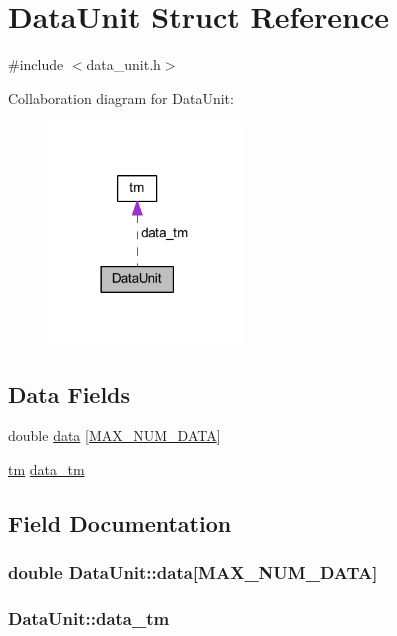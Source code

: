 \hypertarget{struct_data_unit}{\section{Data\-Unit Struct Reference}
\label{struct_data_unit}
}


{\ttfamily \#include $<$data\-\_\-unit.\-h$>$}



Collaboration diagram for Data\-Unit\-:
\nopagebreak
\begin{figure}[H]
\begin{center}
\leavevmode
\includegraphics[width=146pt]{struct_data_unit__coll__graph}
\end{center}
\end{figure}
\subsection*{Data Fields}
\begin{DoxyCompactItemize}
\item 
double \hyperlink{struct_data_unit_a9f22b6f4d67d8bfb0e247cd51a3e1a09}{data} \mbox{[}\hyperlink{common_8h_af796c1f43785b427dbf1ede1da7af498}{M\-A\-X\-\_\-\-N\-U\-M\-\_\-\-D\-A\-T\-A}\mbox{]}
\item 
\hyperlink{structtm}{tm} \hyperlink{struct_data_unit_a1f660834a81d15ce3ec54275f7de1861}{data\-\_\-tm}
\end{DoxyCompactItemize}


\subsection{Field Documentation}
\hypertarget{struct_data_unit_a9f22b6f4d67d8bfb0e247cd51a3e1a09}{
\subsubsection[{data}]{\setlength{\rightskip}{0pt plus 5cm}double Data\-Unit\-::data\mbox{[}{\bf M\-A\-X\-\_\-\-N\-U\-M\-\_\-\-D\-A\-T\-A}\mbox{]}}}\label{struct_data_unit_a9f22b6f4d67d8bfb0e247cd51a3e1a09}
\hypertarget{struct_data_unit_a1f660834a81d15ce3ec54275f7de1861}{
\subsubsection[{data\-\_\-tm}]{ Data\-Unit\-::data\-\_\-tm}}\label{struct_data_unit_a1f660834a81d15ce3ec54275f7de1861}


